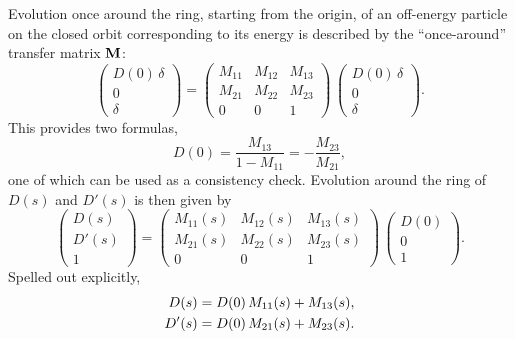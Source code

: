 \documentclass[]{article}
\begin{document}
Evolution once around
the ring, starting from the origin, of an 
off-energy particle on the closed orbit corresponding to 
its energy is described by the ``once-around'' transfer
matrix ${\bf M}$:
%
\begin{equation}
\begin{pmatrix}
D(0)\,\delta \\ 0 \\ \delta
\end{pmatrix}
  =
\begin{pmatrix}
  M_{11}  &  M_{12}  &   M_{13} \\
  M_{21}  &  M_{22}  &   M_{23} \\
   0      &    0     &    1       
\end{pmatrix}\,
\begin{pmatrix}
D(0)\,\delta \\ 0 \\ \delta
\end{pmatrix}.
\label{eq:Dispersion.2} 
\end{equation}
%
This provides two formulas,
%
\begin{equation}
D(0) 
 =
\frac{M_{13}}{1-M_{11}}
 =
-\frac{M_{23}}{M_{21}},
\label{eq:Dispersion.3} 
\end{equation}
%
one of which can be used as a consistency check.
Evolution around the ring of $D(s)$ and $D'(s)$ is then
given by  
%
\begin{equation}
\begin{pmatrix}
D(s) \\ D'(s) \\ 1
\end{pmatrix}
  =
\begin{pmatrix}
  M_{11}(s)  &  M_{12}(s)  &   M_{13}(s) \\
  M_{21}(s)  &  M_{22}(s)  &   M_{23}(s) \\
   0      &    0     &    1       
\end{pmatrix}\,
\begin{pmatrix}
D(0) \\ 0 \\ 1
\end{pmatrix}.
\label{eq:Dispersion.4} 
\end{equation}
%
Spelled out explicitly,
%
\begin{align}
D(s)
 &=
D(0)\,M_{11}(s)
+M_{13}(s),       \notag \\
D'(s)
 &=
D(0)\,M_{21}(s)
+M_{23}(s).
\label{eq:Dispersion.5} 
\end{align}
%
\end{document}
